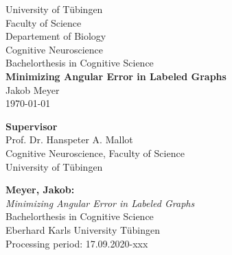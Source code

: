 \documentclass[twoside,12pt,a4paper]{report}
\begin{document}
 
\begin{titlepage}
 \begin{center}
  {\LARGE University of T\"ubingen}\\
  {\large Faculty of Science \\
Departement of Biology\\
Cognitive Neuroscience \\[4cm]}
  {\huge Bachelorthesis in Cognitive Science\\[2cm]}
  {\Large\bf  Minimizing Angular Error in Labeled Graphs \\[1.5cm]}
 {\large Jakob Meyer}\\[0.5cm]
\today\\[3cm]
\begin{center}{\small\bf Supervisor}\\[0.5cm]
{\large Prof. Dr. Hanspeter A. Mallot}\\
  {\footnotesize Cognitive Neuroscience, Faculty of Science\\
	University of T\"ubingen}	
	\end{center}
  \end{center}
\end{titlepage}


\thispagestyle{empty}
\vspace*{\fill}
\begin{minipage}{13.2cm}
\textbf{Meyer, Jakob:}\\
\emph{Minimizing Angular Error in Labeled Graphs}\\ 
Bachelorthesis in Cognitive Science\\
Eberhard Karls University T\"ubingen\\
Processing period: 17.09.2020-xxx
\end{minipage}
\newpage

\setcounter{page}{1}

\end{document}

